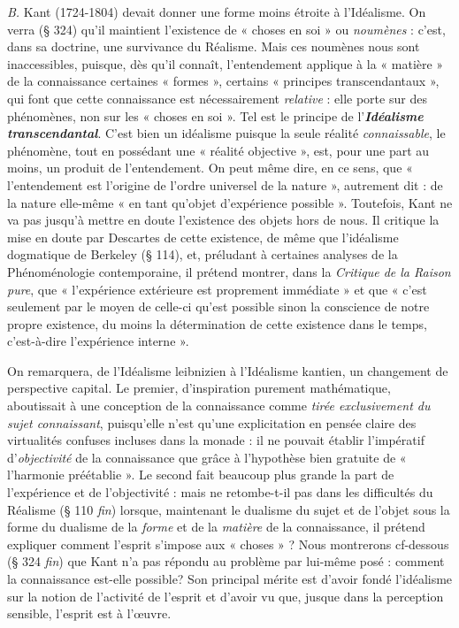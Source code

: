 {\it B.} Kant (1724-1804) devait donner une forme moins étroite à
l’Idéalisme. On verra (§ 324) qu’il maintient l’existence de « choses
en soi » ou {\it noumènes} : c’est, dans sa doctrine, une survivance du
Réalisme. Mais ces noumènes nous sont inaccessibles, puisque, dès
qu’il connaît, l’entendement applique à la « matière » de la connaissance
certaines « formes », certains « principes transcendantaux »,
qui font que cette connaissance est nécessairement {\it relative} : elle
porte sur des phénomènes, non sur les « choses en soi ». Tel est le principe
de l’\textbf{\textit {Idéalisme transcendantal}}. C’est bien un idéalisme puisque
la seule réalité {\it connaissable}, le phénomène, tout en possédant une
« réalité objective », est, pour une part au moins, un produit de l’entendement.
On peut même dire, en ce sens, que « l’entendement est l’origine
de l’ordre universel de la nature », autrement dit : de la nature
elle-même « en tant qu’objet d’expérience possible ». Toutefois, Kant
ne va pas jusqu’à mettre en doute l’existence des objets hors de nous.
Il critique la mise en doute par Descartes de cette existence, de même
que l’idéalisme dogmatique de Berkeley (§ 114), et, préludant à
certaines analyses de la Phénoménologie contemporaine, il prétend
montrer, dans la {\it Critique de la Raison pure}, que « l'expérience extérieure
est proprement immédiate » et que « c’est seulement par le
moyen de celle-ci qu’est possible sinon la conscience de notre propre
existence, du moins la détermination de cette existence dans le
temps, c’est-à-dire l’expérience interne ».

On remarquera, de l’Idéalisme leibnizien à l’Idéalisme kantien, un
changement de perspective capital. Le premier, d'inspiration purement
mathématique, aboutissait à une conception de la connaissance
comme {\it tirée exclusivement du sujet connaissant}, puisqu'elle n’est qu’une
explicitation en pensée claire des virtualités confuses incluses dans la
monade : il ne pouvait établir l’impératif d’{\it objectivité} de la connaissance
que grâce à l'hypothèse bien gratuite de « l'harmonie préétablie ».
Le second fait beaucoup plus grande la part de l’expérience et
de l’objectivité : mais ne retombe-t-il pas dans les difficultés du
Réalisme (§ 110 {\it fin}) lorsque, maintenant le dualisme du sujet et
de l’objet sous la forme du dualisme de la {\it forme} et de la {\it matière} de la
connaissance, il prétend expliquer comment l’esprit s'impose aux
« choses » ? Nous montrerons cf-dessous (§ 324 {\it fin}) que Kant n’a pas
répondu au problème par lui-même posé : comment la connaissance
est-elle possible? Son principal mérite est d’avoir fondé l’idéalisme
sur la notion de l’activité de l'esprit et d’avoir vu que, jusque dans la
perception sensible, l'esprit est à l’œuvre.

